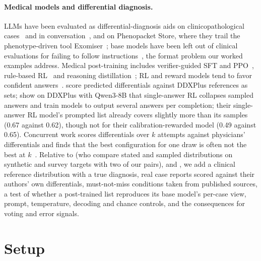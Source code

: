 \documentclass[wcp]{jmlr}
\begin{document}
\paragraph{Medical models and differential diagnosis.}
LLMs have been evaluated as differential-diagnosis aids on clinicopathological cases~\citep{kanjee2023jama,mcduff2025ddx} and in conversation~\citep{tu2025amie}, and on Phenopacket Store, where they trail the phenotype-driven tool Exomiser~\citep{reese2026phenopacket,chimirri2025rare}; base models have been left out of clinical evaluations for failing to follow instructions~\citep{hager2024clinical}, the format problem our worked examples address. Medical post-training includes verifier-guided SFT and PPO~\citep{chen2024huatuogpto1}, rule-based RL~\citep{liu2025alphamed} and reasoning distillation~\citep{huang2025m1}; RL and reward models tend to favor confident answers~\citep{leng2025taming,damani2025rlcr,mei2025reasoninguncertainty}. \citet{fansi2022casande} score predicted differentials against DDXPlus references as sets; \citet{puri2026beyondmode} show on DDXPlus with Qwen3-8B that single-answer RL collapses sampled answers and train models to output several answers per completion; their single-answer RL model's prompted list already covers slightly more than its samples (0.67 against 0.62), though not for their calibration-rewarded model (0.49 against 0.65). Concurrent work scores differentials over $k$ attempts against physicians' differentials and finds that the best configuration for one draw is often not the best at $k$~\citep{lebronnec2026vtc}.
Relative to \citet{jang2026cannotsample} (who compare stated and sampled distributions on synthetic and survey targets with two of our pairs), \citet{puri2026beyondmode} and \citet{karouzos2026where}, we add a clinical reference distribution with a true diagnosis, real case reports scored against their authors' own differentials, must-not-miss conditions taken from published sources, a test of whether a post-trained list reproduces its base model's per-case view, prompt, temperature, decoding and chance controls, and the consequences for voting and error signals.

\section{Setup}\label{sec:setup}
\end{document}
